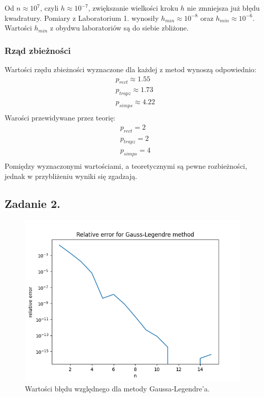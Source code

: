 \documentclass[11pt]{scrartcl}
\begin{document}
    Od $n \approx 10^7$, czyli $h \approx 10^{-7}$, zwiększanie
    wielkości kroku $h$ nie zmniejsza już błędu kwadratury. Pomiary
    z Laboratorium 1. wynosiły $h_{min} \approx 10^{-8}$ oraz $h_{min}
    \approx 10^{-6}$. Wartości $h_{min}$ z obydwu laboratoriów są do
    siebie zbliżone.

    \subsubsection{Rząd zbieżności}
    Wartości rzędu zbieżności wyznaczone dla każdej z metod
    wynoszą odpowiednio:
    \begin{align*}
        &p_{rect} \approx 1.55 \\
        &p_{trapz} \approx 1.73 \\
        &p_{simps} \approx 4.22 \\
    \end{align*}
    Warości przewidywane przez teorię:
    \begin{align*}
        &p_{rect} = 2 \\
        &p_{trapz} = 2 \\
        &p_{simps} = 4 \\
    \end{align*}
    Pomiędzy wyznaczonymi wartościami, a teoretycznymi są pewne
    rozbieżności, jednak w przybliżeniu wyniki się zgadzają.

    \subsection{Zadanie 2.}
    \begin{figure}[H]
        \centering
        \includegraphics[width=0.8\linewidth]{gauss-legendre_err.png}
        \caption{Wartości błędu względnego dla metody
        Gaussa-Legendre'a.}
    \end{figure}
\end{document}
